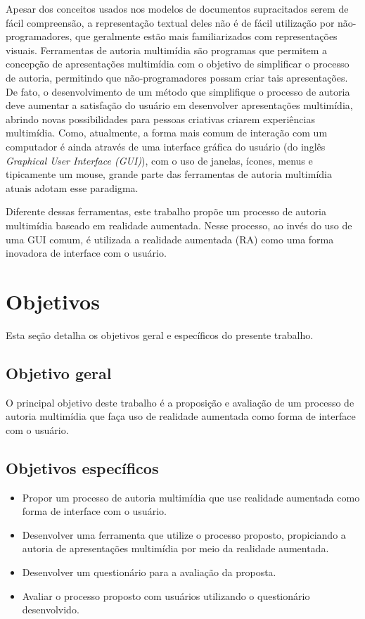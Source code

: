 \documentclass[../main.tex]{subfiles}
\begin{document}
Apesar dos conceitos usados nos modelos de documentos supracitados serem de fácil compreensão, a representação textual deles não é de fácil utilização por não-programadores, que geralmente estão mais familiarizados com representações visuais. Ferramentas de autoria multimídia são programas que permitem a concepção de apresentações multimídia com o objetivo de simplificar o processo de autoria, permitindo que não-programadores possam criar tais apresentações. De fato, o desenvolvimento de um método que simplifique o processo de autoria deve aumentar a satisfação do usuário em desenvolver apresentações multimídia, abrindo novas possibilidades para pessoas criativas criarem experiências multimídia. Como, atualmente, a forma mais comum de interação com um computador é ainda através de uma interface gráfica do usuário (do inglês \emph{Graphical User Interface (GUI)}), com o uso de janelas, ícones, menus e tipicamente um mouse, grande parte das ferramentas de autoria multimídia atuais adotam esse paradigma.

Diferente dessas ferramentas, este trabalho propõe um processo de autoria multimídia baseado em realidade aumentada. Nesse processo, ao invés do uso de uma GUI comum, é utilizada a realidade aumentada (RA) como uma forma inovadora de interface com o usuário.  

\section{Objetivos}
    Esta seção detalha os objetivos geral e específicos do presente trabalho.
\subsection{Objetivo geral}
    O principal objetivo deste trabalho é a proposição e avaliação de um processo de autoria multimídia que faça uso de realidade aumentada como forma de interface com o usuário.
    
\subsection{Objetivos específicos}

\begin{itemize}
\item Propor um processo de autoria multimídia que use realidade aumentada como forma de interface com o usuário.

    \item Desenvolver uma ferramenta que utilize o processo proposto, propiciando a autoria de apresentações multimídia por meio da realidade aumentada.
    
	\item Desenvolver um questionário para a avaliação da proposta.    
  
    \item Avaliar o processo proposto com usuários utilizando o questionário desenvolvido.
    
\end{itemize}
\end{document}
